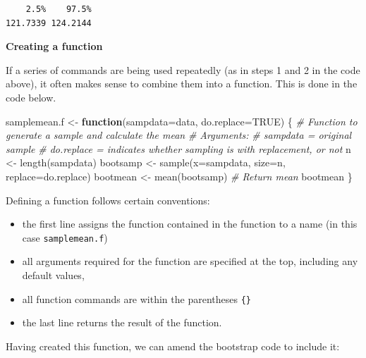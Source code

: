 \documentclass[
  oneside]{krantz}
\newenvironment{Shaded}{\begin{snugshade}}{\end{snugshade}}
\newcommand{\AttributeTok}[1]{\textcolor[rgb]{0.77,0.63,0.00}{#1}}
\newcommand{\CommentTok}[1]{\textcolor[rgb]{0.56,0.35,0.01}{\textit{#1}}}
\newcommand{\ConstantTok}[1]{\textcolor[rgb]{0.00,0.00,0.00}{#1}}
\newcommand{\ControlFlowTok}[1]{\textcolor[rgb]{0.13,0.29,0.53}{\textbf{#1}}}
\newcommand{\FunctionTok}[1]{\textcolor[rgb]{0.00,0.00,0.00}{#1}}
\newcommand{\NormalTok}[1]{#1}
\newcommand{\OtherTok}[1]{\textcolor[rgb]{0.56,0.35,0.01}{#1}}
\providecommand{\tightlist}{%
  \setlength{\itemsep}{0pt}\setlength{\parskip}{0pt}}
\begin{document}
\begin{verbatim}
    2.5%    97.5% 
121.7339 124.2144 
\end{verbatim}

\textbf{Creating a function}

If a series of commands are being used repeatedly (as in steps 1 and 2 in the code above), it often makes sense to combine them into a function. This is done in the code below.

\begin{Shaded}
\begin{Highlighting}[]
\NormalTok{samplemean.f }\OtherTok{\textless{}{-}} \ControlFlowTok{function}\NormalTok{(}\AttributeTok{sampdata=}\NormalTok{data, }\AttributeTok{do.replace=}\ConstantTok{TRUE}\NormalTok{) \{ }
  \CommentTok{\# Function to generate a sample and calculate the mean}
  \CommentTok{\# Arguments: }
    \CommentTok{\# sampdata = original sample }
    \CommentTok{\# do.replace = indicates whether sampling is with replacement, or not}
\NormalTok{  n }\OtherTok{\textless{}{-}} \FunctionTok{length}\NormalTok{(sampdata)}
\NormalTok{  bootsamp }\OtherTok{\textless{}{-}} \FunctionTok{sample}\NormalTok{(}\AttributeTok{x=}\NormalTok{sampdata, }\AttributeTok{size=}\NormalTok{n, }\AttributeTok{replace=}\NormalTok{do.replace)}
\NormalTok{  bootmean }\OtherTok{\textless{}{-}} \FunctionTok{mean}\NormalTok{(bootsamp)}
  \CommentTok{\# Return mean}
\NormalTok{  bootmean}
\NormalTok{\}}
\end{Highlighting}
\end{Shaded}

Defining a function follows certain conventions:

\begin{itemize}
\tightlist
\item
  the first line assigns the function contained in the function to a name (in this case \texttt{samplemean.f})
\item
  all arguments required for the function are specified at the top, including any default values,
\item
  all function commands are within the parentheses \texttt{\{\}}
\item
  the last line returns the result of the function.
\end{itemize}

Having created this function, we can amend the bootstrap code to include it:
\end{document}
